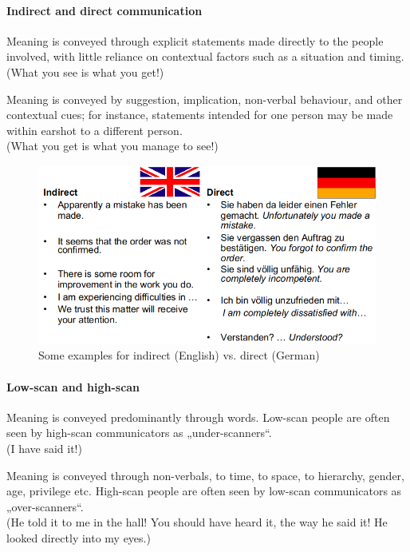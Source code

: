 \paragraph{Indirect and direct communication}
\begin{description}
	\tightlist
	\item[Direct] Meaning is conveyed through explicit statements made directly to the people involved, with little reliance on contextual factors such as a situation and timing.\\
	(What you see is what you get!)
	\item[Indirect] Meaning is conveyed by suggestion, implication, non-verbal behaviour, and other contextual cues; for instance, statements intended for one person may be made within earshot to a different person.\\
	(What you get is what you manage to see!)
\end{description}
\begin{figure}[H]
	\centering
	\includegraphics[width=.8\textwidth]{figures/indirectDirectCommunication.png}
	\caption{Some examples for indirect (English) vs. direct (German)}
\end{figure}

\paragraph{Low-scan and high-scan}
\begin{description}
	\tightlist
	\item[Low-scan] Meaning is conveyed predominantly through words. Low-scan people are often seen by high-scan communicators as „under-scanners“.\\
	(I have said it!)
	\item[High-scan] Meaning is conveyed through non-verbals, to time, to space, to hierarchy, gender, age, privilege etc. High-scan people are often seen by low-scan communicators as „over-scanners“.\\
	(He told it to me in the hall! You should have heard it, the way he said it! He looked directly into my eyes.)
\end{description}


